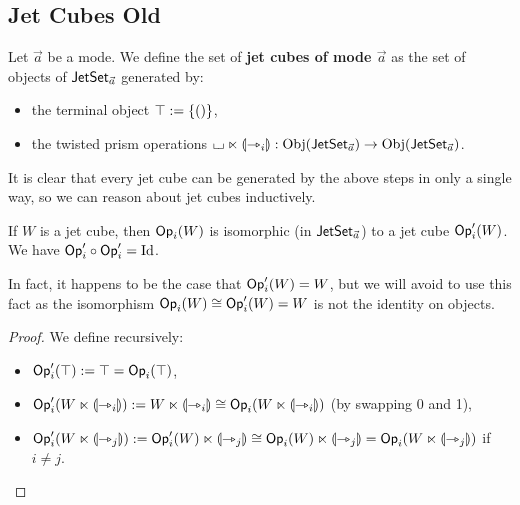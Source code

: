 \documentclass[a4paper]{article}
\begin{document}
\subsection{Jet Cubes Old}
\begin{definition} \label{def:jet-cube}
	Let $\vec a$ be a mode.
	We define the set of \textbf{jet cubes of mode $\vec a$} as the set of objects of $\mathsf{JetSet}_{\vec a}$ generated by:
	\begin{itemize}
		\item the terminal object $\top := \mathopen{}\left\{ () \right\}\mathclose{}$,
		\item the twisted prism operations ${\llcorner\hspace{-.4ex}\lrcorner} \ltimes {\llparenthesis \rightarrowtriangle_i \rrparenthesis} : \mathrm{Obj}(\mathsf{JetSet}_{\vec a}) \to \mathrm{Obj}(\mathsf{JetSet}_{\vec a})$.
	\end{itemize}
\end{definition}
It is clear that every jet cube can be generated by the above steps in only a single way, so we can reason about jet cubes inductively.
\begin{corollary} \label{thm:jet-cube-op}
	If $W$ is a jet cube, then ${\mathsf{Op}}_i(W)$ is isomorphic (in $\mathsf{JetSet}_{\vec a}$) to a jet cube ${\mathsf{Op}}'_i(W)$.
	We have ${\mathsf{Op}}'_i \circ {\mathsf{Op}}'_i = \mathrm{Id}$.
\end{corollary}
In fact, it happens to be the case that ${\mathsf{Op}}'_i(W) = W$, but we will avoid to use this fact as the isomorphism ${\mathsf{Op}}_i(W) \cong {\mathsf{Op}}'_i(W) = W$ is not the identity on objects.
\begin{proof}
	We define recursively:
	\begin{itemize}
		\item ${\mathsf{Op}}'_i(\top) := \top = {\mathsf{Op}}_i(\top)$,
		\item ${\mathsf{Op}}'_i(W \ltimes {\llparenthesis \rightarrowtriangle_i \rrparenthesis}) := W \ltimes {\llparenthesis \rightarrowtriangle_i \rrparenthesis} \cong {\mathsf{Op}}_i(W \ltimes {\llparenthesis \rightarrowtriangle_i \rrparenthesis})$ (by swapping 0 and 1),
		\item ${\mathsf{Op}}'_i(W \ltimes {\llparenthesis \rightarrowtriangle_j \rrparenthesis}) := {\mathsf{Op}}'_i(W) \ltimes {\llparenthesis \rightarrowtriangle_j \rrparenthesis} \cong {\mathsf{Op}}_i(W) \ltimes {\llparenthesis \rightarrowtriangle_j \rrparenthesis} = {\mathsf{Op}}_i(W \ltimes {\llparenthesis \rightarrowtriangle_j \rrparenthesis})$ if $i \neq j$. \qedhere
	\end{itemize}
\end{proof}
\end{document}
